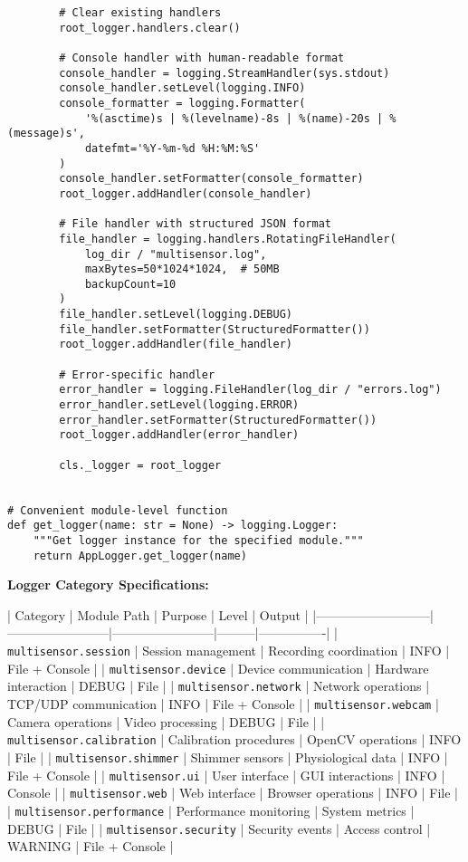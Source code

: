 \documentclass[11pt,a4paper]{article}
\begin{document}
\begin{verbatim}
        # Clear existing handlers
        root_logger.handlers.clear()

        # Console handler with human-readable format
        console_handler = logging.StreamHandler(sys.stdout)
        console_handler.setLevel(logging.INFO)
        console_formatter = logging.Formatter(
            '%(asctime)s | %(levelname)-8s | %(name)-20s | %(message)s',
            datefmt='%Y-%m-%d %H:%M:%S'
        )
        console_handler.setFormatter(console_formatter)
        root_logger.addHandler(console_handler)

        # File handler with structured JSON format
        file_handler = logging.handlers.RotatingFileHandler(
            log_dir / "multisensor.log",
            maxBytes=50*1024*1024,  # 50MB
            backupCount=10
        )
        file_handler.setLevel(logging.DEBUG)
        file_handler.setFormatter(StructuredFormatter())
        root_logger.addHandler(file_handler)

        # Error-specific handler
        error_handler = logging.FileHandler(log_dir / "errors.log")
        error_handler.setLevel(logging.ERROR)
        error_handler.setFormatter(StructuredFormatter())
        root_logger.addHandler(error_handler)

        cls._logger = root_logger


# Convenient module-level function
def get_logger(name: str = None) -> logging.Logger:
    """Get logger instance for the specified module."""
    return AppLogger.get_logger(name)
\end{verbatim}

\textbf{Logger Category Specifications:}

| Category                  | Module Path            | Purpose                | Level   | Output         |
|---------------------------|------------------------|------------------------|---------|----------------|
| \texttt{multisensor.session}     | Session management     | Recording coordination | INFO    | File + Console |
| \texttt{multisensor.device}      | Device communication   | Hardware interaction   | DEBUG   | File           |
| \texttt{multisensor.network}     | Network operations     | TCP/UDP communication  | INFO    | File + Console |
| \texttt{multisensor.webcam}      | Camera operations      | Video processing       | DEBUG   | File           |
| \texttt{multisensor.calibration} | Calibration procedures | OpenCV operations      | INFO    | File           |
| \texttt{multisensor.shimmer}     | Shimmer sensors        | Physiological data     | INFO    | File + Console |
| \texttt{multisensor.ui}          | User interface         | GUI interactions       | INFO    | Console        |
| \texttt{multisensor.web}         | Web interface          | Browser operations     | INFO    | File           |
| \texttt{multisensor.performance} | Performance monitoring | System metrics         | DEBUG   | File           |
| \texttt{multisensor.security}    | Security events        | Access control         | WARNING | File + Console |
\end{document}
